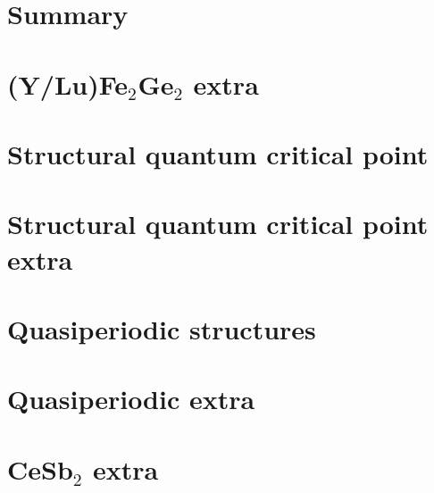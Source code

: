 %


\section{Summary}



\appendix




\section{(Y/Lu)Fe$_2$Ge$_2$ extra}



\section{Structural quantum critical point}

\section{Structural quantum critical point extra}

\section{Quasiperiodic structures}


\section{Quasiperiodic extra}


%
%




% 
\section{CeSb$_2$ extra}






% 


% 
% 

% 


% 


% 




